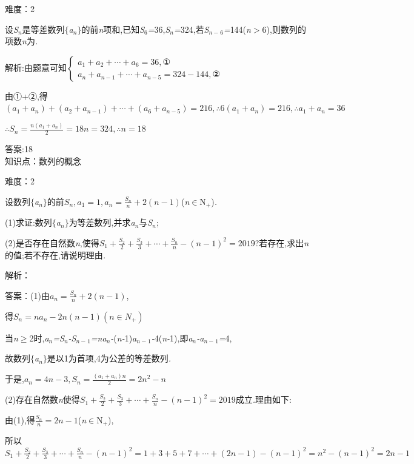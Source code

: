 \documentclass{article} %
\begin{document}
难度：2

 设\textit{S${}_{n}$}是等差数列$\mathrm{\{}$\textit{a${}_{n}$}$\mathrm{\}}$的前\textit{n}项和,已知\textit{S}${}_{6}$\textit{=}36,\textit{S${}_{n}$=}324,若\textit{S${}_{n-}$}${}_{6}$\textit{=}144(\textit{n$>$}6),则数列的项数\textit{n}为\textit{\underbar{　　　　　}.~}

 解析:由题意可知$\left\{
\begin{array}{l}
a_1+a_2+\cdots+a_6=36, ① \\
a_n+a_{n-1}+\cdots +a_{n-5}=324-144, ②
\end{array}
\right.$

由①+②,得$(a_1+a_n)+(a_2+a_{n-1})+\cdots+(a_6+a_{n-5})=216,\therefore 6(a_1+a_n)=216,\therefore a_1+a_n=36$

$\therefore S_n = \frac{n(a_1+a_n)}{2}=18n=324, \therefore n=18$

 答案:18 \\

知识点：数列的概念

难度：2

 设数列$\mathrm{\{}$\textit{a${}_{n}$}$\mathrm{\}}$的前$S_n,a_1=1,a_n=\frac{S_n}{n}+2(n-1)$(\textit{n}$\mathrm{\in}$N\textit{${}_{+}$})\textit{.}

 (1)求证:数列$\mathrm{\{}$\textit{a${}_{n}$}$\mathrm{\}}$为等差数列,并求\textit{a${}_{n}$}与\textit{S${}_{n}$};

 (2)是否存在自然数\textit{n},使得$S_1+\frac{S_2}{2}+\frac{S_3}{3}+\cdots+\frac{S_n}{n}-(n-1)^2=2019$?若存在,求出\textit{n}的值;若不存在,请说明理由\textit{.}

解析：

 答案：(1)由$a_n=\frac{S_n}{n}+2(n-1)$,

得$S_n=na_n-2n(n-1)(n\in N_{+})$

当\textit{n}$\mathrm{\ge}$2时,\textit{a${}_{n}$=S${}_{n}$-S${}_{n-}$}${}_{1}$\textit{=na${}_{n}$-}(\textit{n-}1)\textit{a${}_{n-}$}${}_{1}$\textit{-}4(\textit{n-}1),即\textit{a${}_{n}$-a${}_{n-}$}${}_{1}$\textit{=}4,

故数列$\mathrm{\{}$\textit{a${}_{n}$}$\mathrm{\}}$是以1为首项,4为公差的等差数列\textit{.}

于是,$a_n=4n-3,S_n=\frac{(a_1+a_n)n}{2}=2n^2-n$

 (2)存在自然数\textit{n}使得$S_1+\frac{S_2}{2}+\frac{S_3}{3}+\cdots+\frac{S_n}{n}-(n-1)^2=2019$成立\textit{.}理由如下:

由(1),得$\frac{S_n}{n}=2n-1$(\textit{n}$\mathrm{\in}$N\textit{${}_{+}$}),

所以$S_1+\frac{S_2}{2}+\frac{S_3}{3}+\cdots+\frac{S_n}{n}-(n-1)^2=1+3+5+7+\cdots+(2n-1)-(n-1)^2=n^2-(n-1)^2=2n-1$
\end{document}
